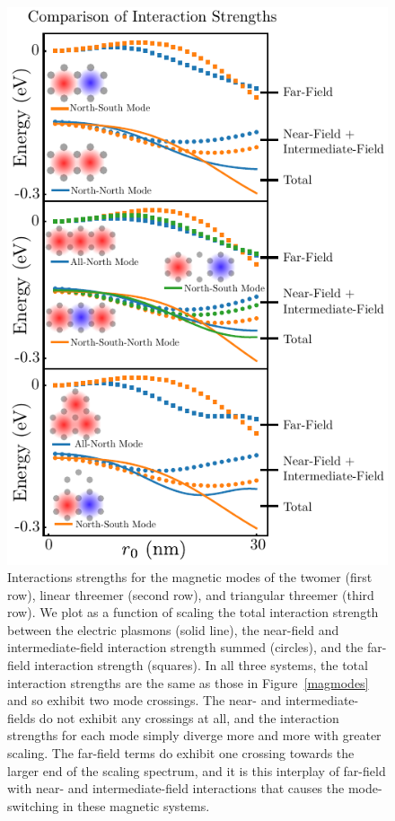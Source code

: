 \documentclass[journal=apchd5,manuscript=article]{achemso}
\begin{document}
\begin{figure}
\centering
\includegraphics[height=0.6\paperheight]{interaction_strength.pdf}
\caption{Interactions strengths for the magnetic modes of the twomer (first row), linear threemer (second row), and triangular threemer (third row). We plot as a function of scaling the total interaction strength between the electric plasmons (solid line), the near-field and intermediate-field interaction strength summed (circles), and the far-field interaction strength (squares). In all three systems, the total interaction strengths are the same as those in Figure~\ref{magmodes} and so exhibit two mode crossings. The near- and intermediate- fields do not exhibit any crossings at all, and the interaction strengths for each mode simply diverge more and more with greater scaling. The far-field terms do exhibit one crossing towards the larger end of the scaling spectrum, and it is this interplay of far-field with near- and intermediate-field interactions that causes the mode-switching in these magnetic systems.}
\label{interactions}
\end{figure}
\end{document}
